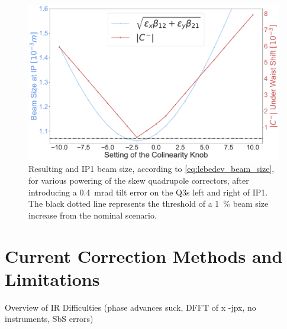 \begin{figure}[!htb]
    \centering
    \includegraphics*[width=0.99\columnwidth]{Figures/Chapter4/colin_correct_dqmin_lebedev_tilt4e-4.pdf}
    \caption{Resulting \AbsCminus and IP1 beam size, according to \cref{eq:lebedev_beam_size}, for various powering of the skew quadrupole correctors, after introducing a \qty{0.4}{\milli\radian} tilt error on the Q3s left and right of IP1. The black dotted line represents the threshold of a \qty{1}{\percent} beam size increase from the nominal scenario.}
    \label{fig:colin_correction_dqmin_lebedev}
\end{figure}


\section{Current Correction Methods and Limitations}

Overview of IR Difficulties (phase advances suck, DFFT of x -jpx, no instruments, SbS errors)





